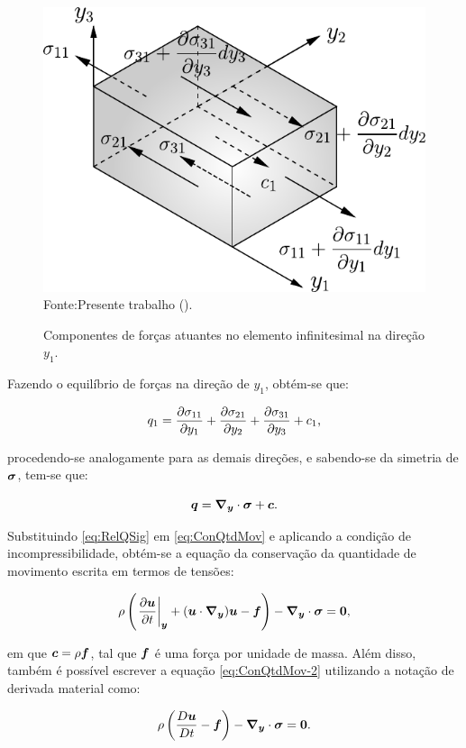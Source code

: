 \begin{figure}[h!]
    \centering
    \caption{Componentes de forças atuantes no elemento infinitesimal na direção $y_1$.}
    \includegraphics[width=.45\linewidth]{Figuras/EqFor.pdf}
    \\Fonte:Presente trabalho (\the\year).
    \label{fig:EqFor}
\end{figure}

Fazendo o equilíbrio de forças na direção de $y_1$, obtém-se que:

\begin{equation}
    q_1=\frac{\partial{\sigma_{11}}}{\partial{y_1}}+\frac{\partial{\sigma_{21}}}{\partial{y_2}}+\frac{\partial{\sigma_{31}}}{\partial{y_3}}+c_1\text{,}
\end{equation}

\noindent procedendo-se analogamente para as demais direções, e sabendo-se da simetria de $\boldsymbol{\sigma}$, tem-se que:

\begin{equation}
    \boldsymbol{q}=\boldsymbol{\nabla_y}\cdot\boldsymbol{\sigma}+\boldsymbol{c}\text{.}
    \label{eq:RelQSig}
\end{equation}

Substituindo \eqref{eq:RelQSig} em \eqref{eq:ConQtdMov} e aplicando a condição de incompressibilidade, obtém-se a equação da conservação da quantidade de movimento escrita em termos de tensões:

\begin{equation}
    \rho\left({\left.\frac{\partial \boldsymbol{u}}{\partial t}\right|_{\boldsymbol{y}}+(\boldsymbol{u}\cdot\boldsymbol{\nabla_y})\boldsymbol{u}-\boldsymbol{f}}\right)-\boldsymbol{\nabla_y}\cdot\boldsymbol{\sigma}=\boldsymbol{0}\text{,}
    \label{eq:ConQtdMov-2}
\end{equation}

\noindent em que $\boldsymbol{c}=\rho\boldsymbol{f}$, tal que $\boldsymbol{f}$ é uma força por unidade de massa. Além disso, também é possível escrever a equação \eqref{eq:ConQtdMov-2} utilizando a notação de derivada material como:

\begin{equation}
    \rho\left({\frac{D\boldsymbol{u}}{Dt}-\boldsymbol{f}}\right)-\boldsymbol{\nabla_y}\cdot\boldsymbol{\sigma}=\boldsymbol{0}\text{.}
    \label{eq:ConQtdMov-3}
\end{equation}

